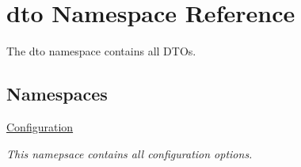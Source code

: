 \hypertarget{namespacedto}{}\section{dto Namespace Reference}
\label{namespacedto}


The dto namespace contains all D\+T\+Os.  


\subsection*{Namespaces}
\begin{DoxyCompactItemize}
\item 
 \mbox{\hyperlink{namespacedto_1_1_configuration}{Configuration}}
\begin{DoxyCompactList}\small\item\em This namepsace contains all configuration options. \end{DoxyCompactList}\end{DoxyCompactItemize}
